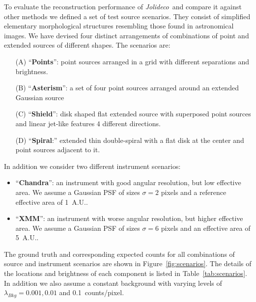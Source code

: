 \documentclass[twocolumn]{aastex631}
\newcommand{\jolideco}{\textit{Jolideco}~}
\begin{document}
    To evaluate the reconstruction performance of \jolideco and compare it against other methods we defined a set of test source scenarios. They consist of simplified elementary morphological structures resembling those found in astronomical images. We have devised four distinct arrangements of combinations of point and extended sources of different shapes. The scenarios are:
    
    \begin{itemize}
        \item[(A)] {\enquote{\bf Points}:} point sources arranged in a grid with different separations and brightness. 
        \item[(B)] {\enquote{\bf Asterism}:} a set of four point sources arranged around an extended Gaussian source
        \item[(C)] {\enquote{\bf Shield}:} disk shaped flat extended source with superposed point sources and linear jet-like features 4 different directions.
        \item[(D)] \enquote{{\bf Spiral}:} extended thin double-spiral with a flat disk at the center and point sources adjacent to it. 
    \end{itemize}

    In addition we consider two different instrument scenarios:

    \begin{itemize}
        \item {\enquote{\bf Chandra}:} an instrument with good angular resolution, but low effective area. We assume a Gaussian PSF of sizes $\sigma = 2$ pixels and a reference effective area of \qty[mode=text]{1}{A.U.}.
        \item {\enquote{\bf XMM}:} an instrument with worse angular resolution, but higher effective area. We assume a Gaussian PSF of sizes $\sigma = 6$ pixels and an effective area of \qty[mode=text]{5}{A.U.}.
    \end{itemize}
    
    The ground truth and corresponding expected counts for all combinations of source and instrument scenarios are shown in Figure~\ref{fig:scenarios}. The details of the locations and brightness of each component is listed in Table~\ref{tab:scenarios}. In addition we also assume a constant background with varying levels of $\lambda_{Bkg}= 0.001, 0.01$ and \qty[mode = text]{0.1}{counts/pixel}. 
\end{document}
